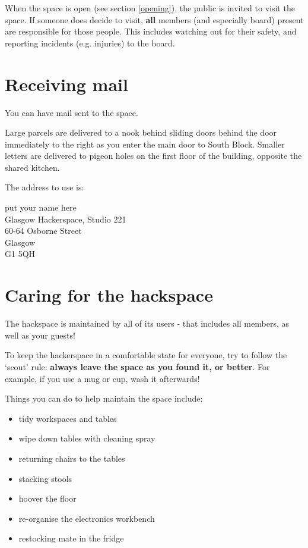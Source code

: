 \documentclass[a5paper,pagesize,10pt,bibtotoc,pointlessnumbers,
normalheadings,DIV=9,twoside=false]{scrbook}
\begin{document}
When the space is open (see section \ref{opening}), the public is invited to visit the space.
If someone does decide to visit, \textbf{all} members (and especially board) present are responsible for those people.
This includes watching out for their safety, and reporting incidents (e.g. injuries) to the board.

\section{Receiving mail}

You can have mail sent to the space. 

Large parcels are delivered to a nook behind sliding doors behind the door immediately to the right as you enter the main door to South Block.
Smaller letters are delivered to pigeon holes on the first floor of the building, opposite the shared kitchen.

The address to use is:

\begin{displayquote}
put your name here \\
Glasgow Hackerspace, Studio 221\\
60-64 Osborne Street\\
Glasgow\\
G1 5QH\\
\end{displayquote}

\section{Caring for the hackspace}

The hackspace is maintained by all of its users - that includes all members, as well as your guests!

To keep the hackerspace in a comfortable state for everyone, try to follow the `scout' rule: \textbf{always leave the space as you found it, or better}. For example, if you use a mug or cup, wash it afterwards!

Things you can do to help maintain the space include:
\begin{itemize}
    \item tidy workspaces and tables
    \item wipe down tables with cleaning spray
    \item returning chairs to the tables
    \item stacking stools
    \item hoover the floor 
    \item re-organise the electronics workbench
    \item restocking mate in the fridge
\end{itemize}
\end{document}
